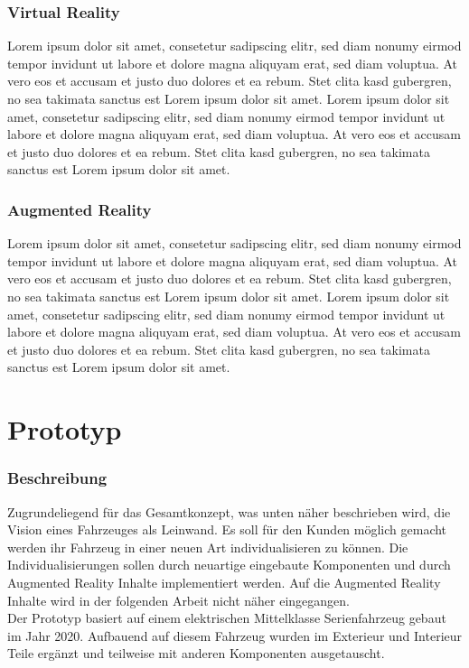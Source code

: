 \subsection{Virtual Reality}
Lorem ipsum dolor sit amet, consetetur sadipscing elitr, sed diam nonumy eirmod tempor invidunt ut labore et dolore magna aliquyam erat, sed diam voluptua. At vero eos et accusam et justo duo dolores et ea rebum. Stet clita kasd gubergren, no sea takimata sanctus est Lorem ipsum dolor sit amet. Lorem ipsum dolor sit amet, consetetur sadipscing elitr, sed diam nonumy eirmod tempor invidunt ut labore et dolore magna aliquyam erat, sed diam voluptua. At vero eos et accusam et justo duo dolores et ea rebum. Stet clita kasd gubergren, no sea takimata sanctus est Lorem ipsum dolor sit amet.
\subsection{Augmented Reality}
Lorem ipsum dolor sit amet, consetetur sadipscing elitr, sed diam nonumy eirmod tempor invidunt ut labore et dolore magna aliquyam erat, sed diam voluptua. At vero eos et accusam et justo duo dolores et ea rebum. Stet clita kasd gubergren, no sea takimata sanctus est Lorem ipsum dolor sit amet. Lorem ipsum dolor sit amet, consetetur sadipscing elitr, sed diam nonumy eirmod tempor invidunt ut labore et dolore magna aliquyam erat, sed diam voluptua. At vero eos et accusam et justo duo dolores et ea rebum. Stet clita kasd gubergren, no sea takimata sanctus est Lorem ipsum dolor sit amet.

\chapter{Prototyp}
\label{cha:Prototyp}
\subsection{Beschreibung}
 Zugrundeliegend für das Gesamtkonzept, was unten näher beschrieben wird, die Vision eines Fahrzeuges als Leinwand. Es soll für den Kunden möglich gemacht werden ihr Fahrzeug in einer neuen Art individualisieren zu können. Die Individualisierungen sollen durch neuartige eingebaute Komponenten und durch Augmented Reality Inhalte implementiert werden. Auf die Augmented Reality Inhalte wird in der folgenden Arbeit nicht näher eingegangen.\\
 Der Prototyp basiert auf einem elektrischen Mittelklasse Serienfahrzeug gebaut im Jahr 2020. Aufbauend auf diesem Fahrzeug wurden im Exterieur und Interieur Teile ergänzt und teilweise mit anderen Komponenten ausgetauscht.
